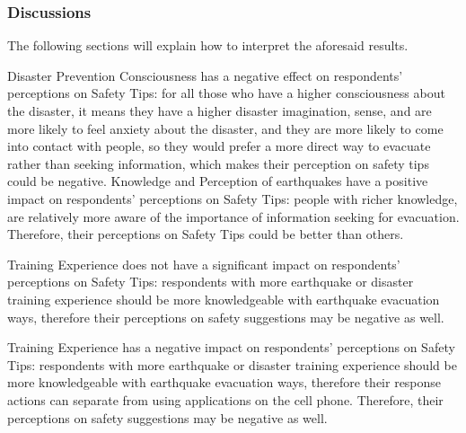 \subsubsection{Discussions}
The following sections will explain how to interpret the aforesaid results. 

Disaster Prevention Consciousness has a negative effect on respondents' perceptions on Safety Tips: for all those who have a higher consciousness about the disaster, it means they have a higher disaster imagination, sense, and are more likely to feel anxiety about the disaster, and they are more likely to come into contact with people, so they would prefer a more direct way to evacuate rather than seeking information, which makes their perception on safety tips could be negative.
Knowledge and Perception of earthquakes have a positive impact on respondents' perceptions on Safety Tips: people with richer knowledge, are relatively more aware of the importance of information seeking for evacuation. Therefore, their perceptions on Safety Tips could be better than others.

Training Experience does not have a significant impact on respondents' perceptions on Safety Tips: respondents with more earthquake or disaster training experience should be more knowledgeable with earthquake evacuation ways, therefore their perceptions on safety suggestions may be negative as well. 

Training Experience has a negative impact on respondents' perceptions on Safety Tips: respondents with more earthquake or disaster training experience should be more knowledgeable with earthquake evacuation ways, therefore their response actions can separate from using applications on the cell phone. Therefore, their perceptions on safety suggestions may be negative as well. 













































